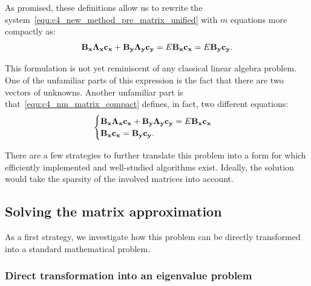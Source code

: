 As promised, these definitions allow us to rewrite the system~\eqref{equ:c4_new_method_pre_matrix_unified} with $m$ equations more compactly as:
\begin{equation}\label{equ:c4_nm_matrix_compact}
    \vb{B_x} \vb{\Lambda_x}\vb{c_x} + \vb{B_y} \vb{\Lambda_y}\vb{c_y} = E \vb{B_x} \vb{c_x} = E \vb{B_y} \vb{c_y}\text{.}
\end{equation}

This formulation is not yet reminiscent of any classical linear algebra problem. One of the unfamiliar parts of this expression is the fact that there are two vectors of unknowns. Another unfamiliar part is that~\eqref{equ:c4_nm_matrix_compact} defines, in fact, two different equations:
\begin{equation}
    \begin{cases}
        \vb{B_x} \vb{\Lambda_x}\vb{c_x} + \vb{B_y} \vb{\Lambda_y}\vb{c_y} = E \vb{B_x} \vb{c_x} \\
        \vb{B_x} \vb{c_x} = \vb{B_y} \vb{c_y}\text{.}
    \end{cases} \label{equ:c4_new_method_first_matrix_problem}
\end{equation}

There are a few strategies to further translate this problem into a form for which efficiently implemented and well-studied algorithms exist. Ideally, the solution would take the sparsity of the involved matrices into account.

\subsection{Solving the matrix approximation}

As a first strategy, we investigate how this problem can be directly transformed into a standard mathematical problem.

\subsubsection{Direct transformation into an eigenvalue problem}\label{sec:c4_nm_direct_transform}


